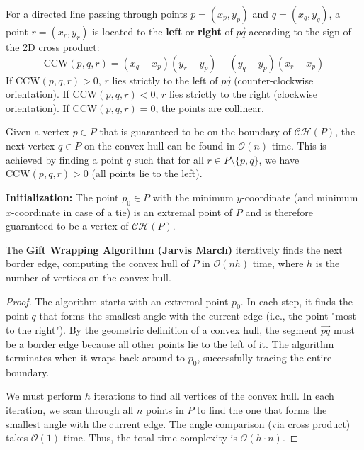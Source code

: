 \begin{definition}
	For a directed line passing through points $p = (x_p, y_p)$ and $q = (x_q, y_q)$, a point $r = (x_r, y_r)$ is located to the \textbf{left} or \textbf{right} of $\vec{pq}$ according to the sign of the 2D cross product:
	$$ \text{CCW}(p, q, r) = (x_q - x_p)(y_r - y_p) - (y_q - y_p)(x_r - x_p) $$
	If $\text{CCW}(p, q, r) > 0$, $r$ lies strictly to the left of $\vec{pq}$ (counter-clockwise orientation). If $\text{CCW}(p, q, r) < 0$, $r$ lies strictly to the right (clockwise orientation). If $\text{CCW}(p, q, r) = 0$, the points are collinear.
\end{definition}

\begin{theorem}
	Given a vertex $p \in P$ that is guaranteed to be on the boundary of $\mathcal{CH}(P)$, the next vertex $q \in P$ on the convex hull can be found in $\mathcal{O}(n)$ time. This is achieved by finding a point $q$ such that for all $r \in P \setminus \{p, q\}$, we have $\text{CCW}(p, q, r) > 0$ (all points lie to the left).
\end{theorem}

\begin{remark}
	\textbf{Initialization:} The point $p_0 \in P$ with the minimum $y$-coordinate (and minimum $x$-coordinate in case of a tie) is an extremal point of $P$ and is therefore guaranteed to be a vertex of $\mathcal{CH}(P)$.
\end{remark}

\begin{theorem}
	The \textbf{Gift Wrapping Algorithm (Jarvis March)} iteratively finds the next border edge, computing the convex hull of $P$ in $\mathcal{O}(nh)$ time, where $h$ is the number of vertices on the convex hull.
\end{theorem}

\begin{proof}
	The algorithm starts with an extremal point $p_0$. In each step, it finds the point $q$ that forms the smallest angle with the current edge (i.e., the point "most to the right"). By the geometric definition of a convex hull, the segment $\vec{pq}$ must be a border edge because all other points lie to the left of it. The algorithm terminates when it wraps back around to $p_0$, successfully tracing the entire boundary.

	We must perform $h$ iterations to find all vertices of the convex hull. In each iteration, we scan through all $n$ points in $P$ to find the one that forms the smallest angle with the current edge. The angle comparison (via cross product) takes $\mathcal{O}(1)$ time. Thus, the total time complexity is $\mathcal{O}(h \cdot n)$.
\end{proof}

